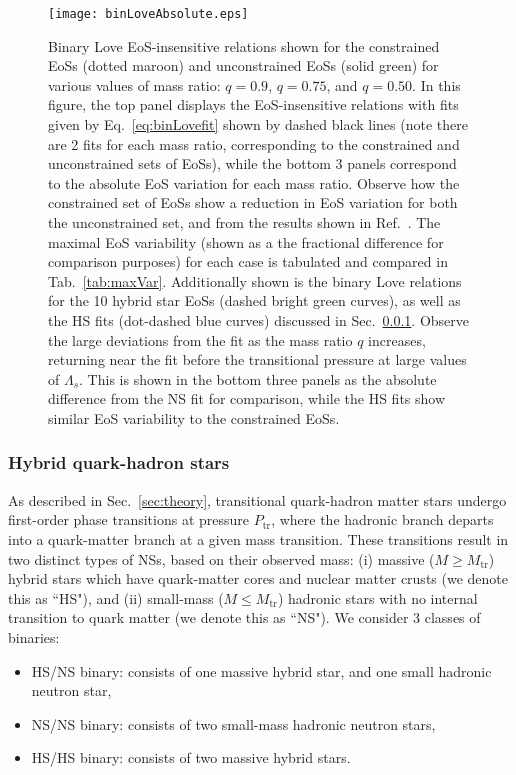 \documentclass[prd,twocolumn,nofootinbib,superscriptaddress,amsmath,amssymb]{revtex4-1}
\begin{document}
\begin{figure}
\begin{center} 
\texttt{[image: binLoveAbsolute.eps]}%
\end{center}
\caption{
Binary Love EoS-insensitive relations shown for the constrained EoSs (dotted maroon) and unconstrained EoSs (solid green) for various values of mass ratio: $q=0.9$, $q=0.75$, and $q=0.50$.
In this figure, the top panel displays the EoS-insensitive relations with fits given by Eq.~\ref{eq:binLovefit} shown by dashed black lines (note there are 2 fits for each mass ratio, corresponding to the constrained and unconstrained sets of EoSs), while the bottom 3 panels correspond to the absolute EoS variation for each mass ratio.
Observe how the constrained set of EoSs show a reduction in EoS variation for both the unconstrained set, and from the results shown in Ref.~\cite{Yagi:binLove}.
The maximal EoS variability (shown as a the fractional difference for comparison purposes) for each case is tabulated and compared in Tab.~\ref{tab:maxVar}.
Additionally shown is the binary Love relations for the 10 hybrid star EoSs (dashed bright green curves), as well as the HS fits (dot-dashed blue curves) discussed in Sec.~\ref{sec:binLove-hybrid}.
Observe the large deviations from the fit as the mass ratio $q$ increases, returning near the fit before the transitional pressure at large values of $\Lambda_s$.
This is shown in the bottom three panels as the absolute difference from the NS fit for comparison, while the HS fits show similar EoS variability to the constrained EoSs.
}
\label{fig:binLove}
\end{figure} 

\subsubsection{Hybrid quark-hadron stars}\label{sec:binLove-hybrid}
As described in Sec.~\ref{sec:theory}, transitional quark-hadron matter stars undergo first-order phase transitions at pressure $P_{\text{tr}}$, where the hadronic branch departs into a quark-matter branch at a given mass transition.
These transitions result in two distinct types of NSs, based on their observed mass: (i) massive ($M \geq M_{\text{tr}}$) hybrid stars which have quark-matter cores and nuclear matter crusts (we denote this as ``HS"), and (ii) small-mass ($M \leq M_{\text{tr}}$) hadronic stars with no internal transition to quark matter (we denote this as ``NS").
We consider 3 classes of binaries:
\begin{itemize}
\item HS/NS binary: consists of one massive hybrid star, and one small hadronic neutron star,
\item NS/NS binary: consists of two small-mass hadronic neutron stars,
\item HS/HS binary: consists of two massive hybrid stars.
\end{itemize}
\end{document}
